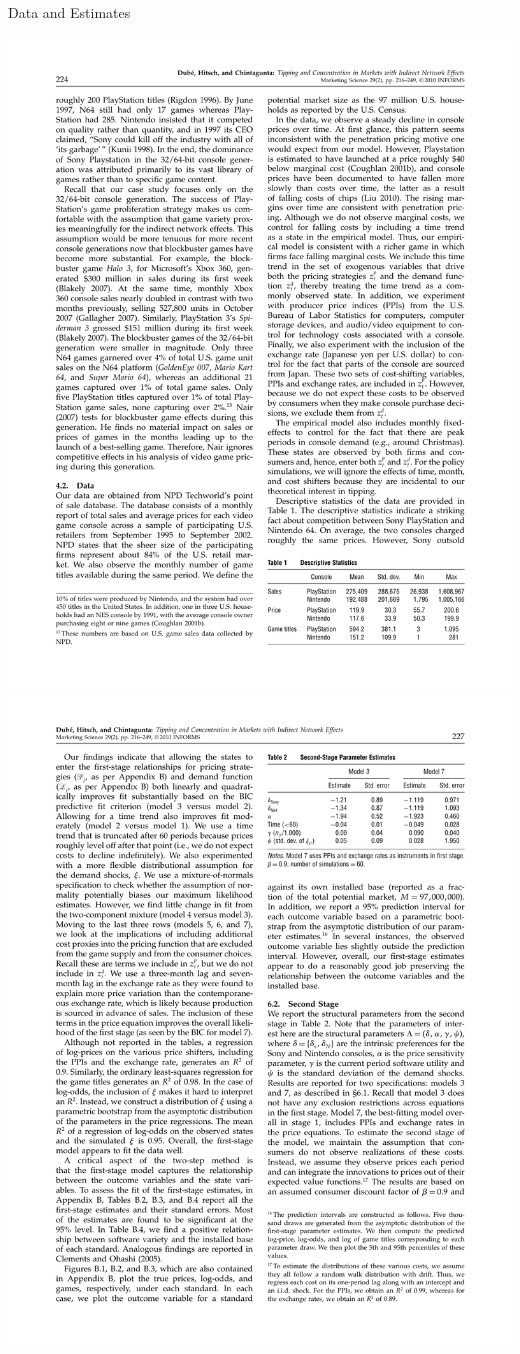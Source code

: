 \documentclass[xcolor=pdftex,dvipsnames,table,mathserif,aspectratio=169]{beamer}
\begin{document}
\begin{frame}{Data and Estimates}
\begin{center}
\includegraphics[scale=0.5]{resources/dube-table1}\\
\includegraphics[scale=0.5]{resources/dube-table2}

\end{center}
\end{frame}
\end{document}

